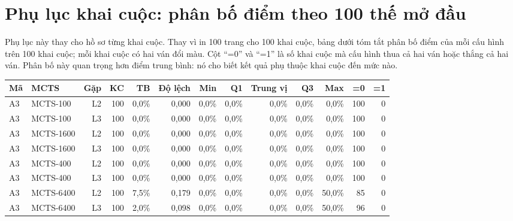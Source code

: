 \chapter{Phụ lục khai cuộc: phân bố điểm theo 100 thế mở đầu}

\label{app:khai-cuoc}

Phụ lục này thay cho hồ sơ từng khai cuộc. Thay vì in 100 trang cho 100 khai cuộc, bảng dưới tóm tắt phân bố điểm của mỗi cấu hình trên 100 khai cuộc; mỗi khai cuộc có hai ván đổi màu. Cột ``=0'' và ``=1'' là số khai cuộc mà cấu hình thua cả hai ván hoặc thắng cả hai ván. Phân bố này quan trọng hơn điểm trung bình: nó cho biết kết quả phụ thuộc khai cuộc đến mức nào.

\begin{center}\scriptsize\setlength{\tabcolsep}{3pt}

\begin{tabular}{@{}llrrrrrrrrrrr@{}}

\toprule

Mã & MCTS & Gặp & KC & TB & Độ lệch & Min & Q1 & Trung vị & Q3 & Max & =0 & =1 \\

\midrule

A3 & MCTS-100 & L2 & 100 & 0,0\% & 0,000 & 0,0\% & 0,0\% & 0,0\% & 0,0\% & 0,0\% & 100 & 0 \\

A3 & MCTS-100 & L3 & 100 & 0,0\% & 0,000 & 0,0\% & 0,0\% & 0,0\% & 0,0\% & 0,0\% & 100 & 0 \\

A3 & MCTS-1600 & L2 & 100 & 0,0\% & 0,000 & 0,0\% & 0,0\% & 0,0\% & 0,0\% & 0,0\% & 100 & 0 \\

A3 & MCTS-1600 & L3 & 100 & 0,0\% & 0,000 & 0,0\% & 0,0\% & 0,0\% & 0,0\% & 0,0\% & 100 & 0 \\

A3 & MCTS-400 & L2 & 100 & 0,0\% & 0,000 & 0,0\% & 0,0\% & 0,0\% & 0,0\% & 0,0\% & 100 & 0 \\

A3 & MCTS-400 & L3 & 100 & 0,0\% & 0,000 & 0,0\% & 0,0\% & 0,0\% & 0,0\% & 0,0\% & 100 & 0 \\

A3 & MCTS-6400 & L2 & 100 & 7,5\% & 0,179 & 0,0\% & 0,0\% & 0,0\% & 0,0\% & 50,0\% & 85 & 0 \\

A3 & MCTS-6400 & L3 & 100 & 2,0\% & 0,098 & 0,0\% & 0,0\% & 0,0\% & 0,0\% & 50,0\% & 96 & 0 \\


\end{tabular}
\end{center}
